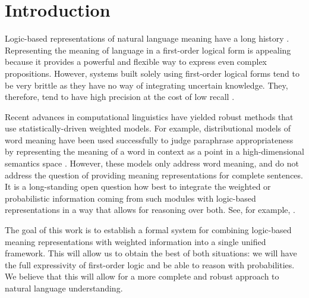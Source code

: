 \section{Introduction}

Logic-based representations of natural language meaning have a long history
\citep{montague:tj1970,kamp:book93}\nocite{thomason:book1974}.
Representing the meaning of language in a first-order logical form is appealing
because it provides a powerful and flexible way to express even complex
propositions. However, systems built solely using first-order logical forms tend
to be very brittle as they have no way of integrating uncertain knowledge.
They, therefore, tend to have high precision at the cost of low recall
\citep{bos:emnlp2005}.

Recent advances in computational linguistics have yielded robust methods that
use statistically-driven weighted models.  For example, distributional
models of word meaning have been used successfully to judge paraphrase
appropriateness by representing the meaning of a word in context as a point in a
high-dimensional semantics space
\citep{erk:emnlp2008,thater:acl2010,reisinger:naacl2010,dinu:emnlp2010,vandecruys:emnlp2011}.
However, these models only address word meaning, and do not
address the question of providing meaning representations for complete
sentences. It is a long-standing open question how best to
integrate the weighted or probabilistic information coming from such modules
with logic-based representations in a way that allows for reasoning over both. 
See, for example, \citet{hobbs:alj93}.

The goal of this work is to establish a formal system for combining
logic-based meaning representations with weighted information into a single
unified framework.  This will allow us to obtain the best of both situations: we
will have the full expressivity of first-order logic and be able to reason with
probabilities.  We believe that this will allow for a more complete and robust
approach to natural language understanding.

